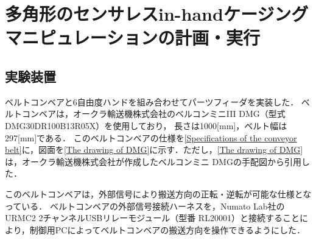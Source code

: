 \documentclass[a4paper,twoside,12pt,papersize, dvipdfmx]{iirthesis}
\begin{document}
    \newcommand{\figref}[1]{\figurename\ref{#1}}
    \newcommand{\tabref}[1]{\tablename\ref{#1}}
    \renewcommand{\eqref}[1]{式~(\ref{#1})}
    \newcommand{\chapref}[1]{\ref{#1}章}
    \newcommand{\secref}[1]{\ref{#1}節}
    \newcommand{\ssecref}[1]{\ref{#1}項}
    \newcommand{\appref}[1]{付録\ref{#1}}
\fi


\chapter{多角形のセンサレスin-handケージングマニピュレーションの計画・実行}\label{chap::result}
\minitoc

\section{実験装置 \cite{kamikukita2022}}\label{sec::result::development}
ベルトコンベアと6自由度ハンドを組み合わせてパーツフィーダを実装した．
ベルトコンベアは，オークラ輸送機株式会社のベルコンミニI\hspace{-.1em}I\hspace{-.1em}I DMG（型式 DMG30DR100B13R05X）を使用しており，
長さは1000[mm]，ベルト幅は297[mm]である．
このベルトコンベアの仕様を\tabref{Specifications of the conveyor belt}に，図面を\figref{The drawing of DMG}に示す．ただし，\figref{The drawing of DMG}は，オークラ輸送機株式会社が作成したベルコンミニ DMGの手配図から引用した．

このベルトコンベアは，外部信号により搬送方向の正転・逆転が可能な仕様となっている．
ベルトコンベアの外部信号接続ハーネスを，Numato Lab社のURMC2 2チャンネルUSBリレーモジュール（型番 RL20001）と接続することにより，制御用PCによってベルトコンベアの搬送方向を操作できるようにした．
\end{document}
